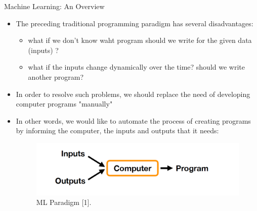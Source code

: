 \documentclass[compress,oilve]{beamer}
\begin{document}
\begin{frame}{Machine Learning: An Overview}
\begin{itemize}
\item The preceding traditional programming paradigm has several disadvantages:
	\begin{itemize}
	\item what if we don't know waht program should we write for the given data (inputs) ?
	\item what if the inputs change dynamically over the time? should we write another program? 
	\end{itemize}
\item In order to resolve such problems, we should replace the need of developing computer programs "manually"
\item In other words, we would like to automate the process of creating programs by informing the computer, the inputs and outputs that it needs:
\begin{center}
\begin{figure}
\includegraphics[scale=0.5]{2}
\center \caption{ML Paradigm [1].}
\end{figure}
\end{center}
\end{itemize}
\end{frame}



\end{document}
